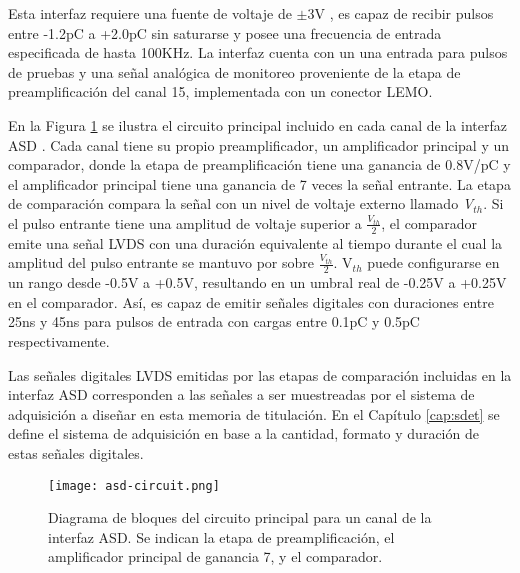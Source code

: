 Esta interfaz requiere una fuente de voltaje de $\pm$3V\cite{1999ATLASICs} , es capaz de recibir pulsos entre -1.2pC a +2.0pC sin saturarse y posee una frecuencia de entrada especificada  de hasta 100KHz. La interfaz cuenta con un una entrada para pulsos de pruebas y una señal analógica de monitoreo proveniente de la etapa de preamplificación del canal 15, implementada con un conector LEMO.

En la Figura \ref{img:asd-circuit}  se ilustra el circuito principal incluido en cada canal de la interfaz ASD . Cada canal tiene su propio preamplificador, un amplificador principal y un comparador\cite{1999ATLASICs}, donde la etapa de preamplificación tiene una ganancia de 0.8V/pC y el amplificador principal tiene una ganancia de 7 veces la señal entrante. La etapa de comparación compara la señal con un nivel de voltaje externo llamado \textit{V$_{th}$}. Si el pulso entrante tiene una amplitud de voltaje superior a $\frac{V_{th}}{2}$, el comparador emite una señal LVDS con una duración equivalente al tiempo durante el cual la amplitud del pulso entrante se mantuvo por sobre $\frac{V_{th}}{2}$. V$_{th}$ puede configurarse en un rango desde -0.5V a +0.5V, resultando en un umbral real de -0.25V a +0.25V en el comparador\cite{1999ATLASICs}. Así, es capaz de emitir señales digitales con duraciones entre 25ns y 45ns para pulsos de entrada con cargas entre 0.1pC y 0.5pC respectivamente.

Las señales digitales LVDS emitidas por las etapas de comparación incluidas en la interfaz ASD corresponden a las señales a ser muestreadas por el sistema de adquisición a diseñar en esta memoria de titulación. En el Capítulo \ref{cap:sdet} se define el sistema de adquisición en base a la cantidad, formato y duración de estas señales digitales.

\begin{figure}[h]
	\centering
	\texttt{[image: asd-circuit.png]}
	\caption{Diagrama de bloques del circuito principal para un canal de la interfaz ASD. Se indican la etapa de preamplificación, el amplificador principal de ganancia 7, y el comparador.}
	\label{img:asd-circuit}
\end{figure}

